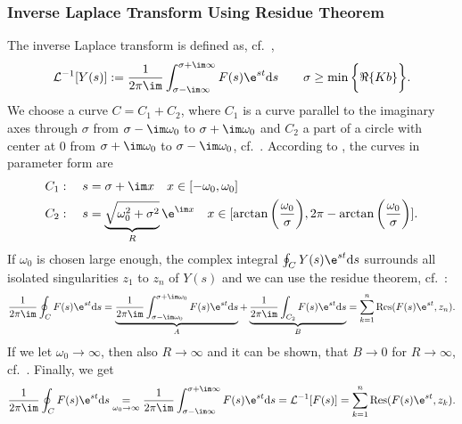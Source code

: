 \subsubsection{Inverse Laplace Transform Using Residue Theorem}
The inverse Laplace transform is defined as, cf.~\cite{UlrichWeber2017},
\begin{align}
	\mathcal{L}^{-1}[Y(s)]:=\frac{1}{2\pi\im}\int_{\sigma-\im\infty}^{\sigma+\im\infty}F(s)\e^{st}\mathrm{d}s\quad\quad \sigma \geq \min \bigg \{\Re \{Kb\} \bigg\}.
\end{align}
%
We choose a curve $C = C_1 + C_2$, where $C_1$ is a curve parallel to the imaginary axes through $\sigma$ from $\sigma -\im\omega_0$ to $\sigma + \im\omega_0$ and $C_2$ a part of a circle with center at $0$ from $\sigma +\im\omega_0$ to $\sigma - \im\omega_0$, cf.~\cite{UlrichWeber2017}.
According to \cite[Fig.~3.5]{UlrichWeber2017}, the curves in parameter form are
\begin{align}
	&C_1:\quad s = \sigma+\im x \quad x \in [-\omega_0,\omega_0] \\
	&C_2:\quad s = \underbrace{\sqrt{\omega_0^2+\sigma^2}}_R \e^{\im x} \quad x \in [\arctan\bigg (\frac{\omega_0}{\sigma}\bigg ) ,2\pi-\arctan\bigg ( \frac{\omega_0}{\sigma}\bigg ) ].
\end{align}
%
If $\omega_0$ is chosen large enough, the complex integral $\oint_CY(s)\e^{st}\mathrm{d}s$ surrounds all isolated singularities $z_1$ to $z_n$ of $Y(s)$ and we can use the residue theorem, cf.~\cite{UlrichWeber2017}:
\begin{align}
	\frac{1}{2\pi\im}\oint_C F(s)\e^{st}\mathrm{d}s=\underbrace{\frac{1}{2\pi\im}\int_{\sigma-\im\omega_0}^{\sigma+\im\omega_0}F(s)\e^{st}\mathrm{d}s}_{A}+\underbrace{\frac{1}{2\pi\im}\int_{C_2}F(s)\e^{st}\mathrm{d}s}_{B}=\sum_{k=1}^{n}\mathrm{Res}(F(s)\e^{st},z_n).
\end{align}
%
If we let $\omega_0\rightarrow\infty$, then also $R\rightarrow\infty$ and it can be shown, that $B \rightarrow 0$ for $R\rightarrow \infty$, cf.~\cite{UlrichWeber2017}.
%
Finally, we get
\begin{align}
	\frac{1}{2\pi\im}\oint_C F(s)\e^{st}\mathrm{d}s\underset{\omega_0\rightarrow\infty}{=}\frac{1}{2\pi\im}\int_{\sigma-\im\infty}^{\sigma+\im\infty}F(s)\e^{st}\mathrm{d}s=\mathcal{L}^{-1}[F(s)]=\sum_{k=1}^{n}\mathrm{Res}(F(s)\e^{st},z_k).
\end{align}
